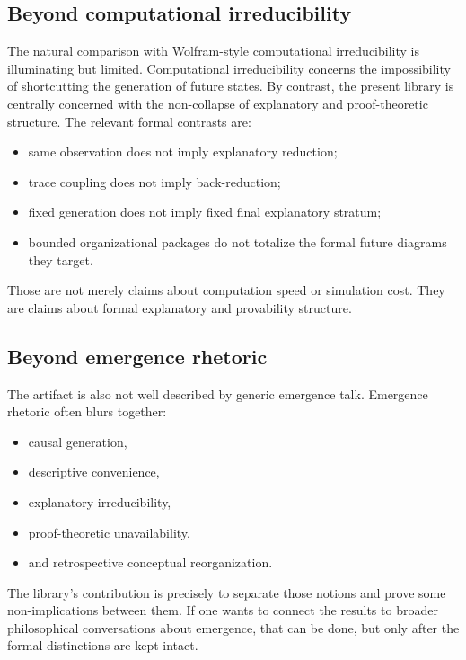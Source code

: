 \documentclass[11pt,a4paper]{article}
\theoremstyle{definition}
\begin{document}
\subsection{Beyond computational irreducibility}

The natural comparison with Wolfram-style computational irreducibility \cite{Wolfram2002} is illuminating but limited. Computational irreducibility concerns the impossibility of shortcutting the generation of future states. By contrast, the present library is centrally concerned with the non-collapse of explanatory and proof-theoretic structure. The relevant formal contrasts are:
\begin{itemize}[leftmargin=2em]
\item same observation does not imply explanatory reduction;
\item trace coupling does not imply back-reduction;
\item fixed generation does not imply fixed final explanatory stratum;
\item bounded organizational packages do not totalize the formal future diagrams they target.
\end{itemize}

Those are not merely claims about computation speed or simulation cost. They are claims about formal explanatory and provability structure.

\subsection{Beyond emergence rhetoric}

The artifact is also not well described by generic emergence talk. Emergence rhetoric often blurs together:
\begin{itemize}[leftmargin=2em]
\item causal generation,
\item descriptive convenience,
\item explanatory irreducibility,
\item proof-theoretic unavailability,
\item and retrospective conceptual reorganization.
\end{itemize}

The library's contribution is precisely to separate those notions and prove some non-implications between them. If one wants to connect the results to broader philosophical conversations about emergence, that can be done, but only after the formal distinctions are kept intact.
\end{document}
